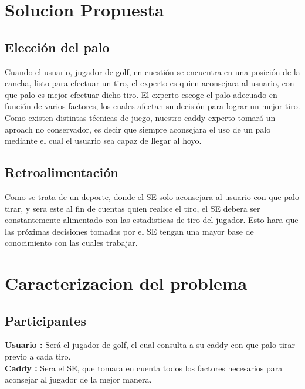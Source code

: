 \documentclass[runningheads,a4paper]{llncs}
\begin{document}
\section{Solucion Propuesta}
\subsection{Elección del palo}
Cuando el usuario, jugador de golf, en cuestión se encuentra en una posición de la cancha, listo para efectuar un tiro, el experto es quien aconsejara al usuario, con que palo es mejor efectuar dicho tiro. El experto escoge el palo adecuado en función de varios factores, los cuales afectan su decisión para lograr un mejor tiro.\\
	Como existen distintas técnicas de juego, nuestro caddy experto tomará un aproach no conservador, es decir que siempre aconsejara el uso de un palo mediante el cual el usuario sea capaz de llegar al hoyo.
	
\subsection{Retroalimentación}
Como se trata de un deporte, donde el SE solo aconsejara al usuario con que palo tirar, y sera este al fin de cuentas quien realice el tiro, el SE debera ser constantemente alimentado con las estadisticas de tiro del jugador. Esto hara que las próximas decisiones tomadas por el SE tengan una mayor base de conocimiento con las cuales trabajar.\\
 
\section{Caracterizacion del problema}
\subsection{Participantes}
\textbf{Usuario :} Será el jugador de golf, el cual consulta a su caddy con que palo tirar previo a cada tiro.\\
\textbf{Caddy :} Sera el SE, que tomara en cuenta todos los factores necesarios para aconsejar al jugador de la mejor manera.\\
\end{document}
